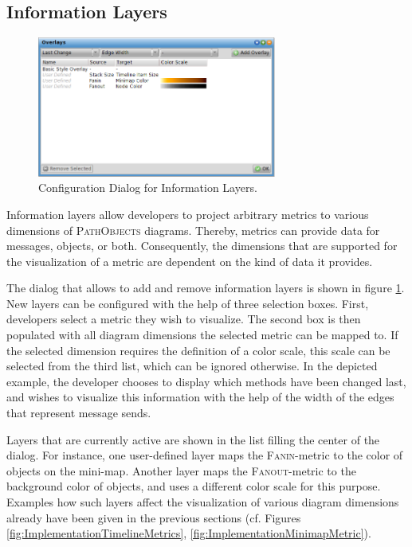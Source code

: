 \subsection{Information Layers}
\label{ss:ImplementationLayers}

\begin{figure}[tb]
	\centering
	\includegraphics[width=0.7\textwidth]{../images/04-ImplOverlays}
	\caption{Configuration Dialog for Information Layers.}
	\label{fig:ImplementationLayers}
\end{figure}

Information layers allow developers to project arbitrary metrics to various dimensions of \textsc{PathObjects} diagrams.
Thereby, metrics can provide data for messages, objects, or both.
Consequently, the dimensions that are supported for the visualization of a metric are dependent on the kind of data it provides.

The dialog that allows to add and remove information layers is shown in figure \ref{fig:ImplementationLayers}.
New layers can be configured with the help of three selection boxes.
First, developers select a metric they wish to visualize.
The second box is then populated with all diagram dimensions the selected metric can be mapped to.
If the selected dimension requires the definition of a color scale, this scale can be selected from the third list, which can be ignored otherwise.
In the depicted example, the developer chooses to display which methods have been changed last, and wishes to visualize this information with the help of the width of the edges that represent message sends.

Layers that are currently active are shown in the list filling the center of the dialog.
For instance, one user-defined layer maps the \textsc{Fanin}-metric to the color of objects on the mini-map.
Another layer maps the \textsc{Fanout}-metric to the background color of objects, and uses a different color scale for this purpose.
Examples how such layers affect the visualization of various diagram dimensions already have been given in the previous sections (cf. Figures \ref{fig:ImplementationTimelineMetrics}, \ref{fig:ImplementationMinimapMetric}).

